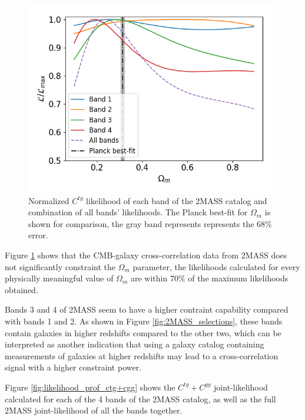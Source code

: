 \documentclass[openany,a4paper,12pt,oneside]{book}
\begin{document}
\begin{spacing}{1.5}
\begin{figure}[!htb]
	\centering
	\includegraphics[width=.7\linewidth]{Imagens/profile_ctg_Nmc2e7.png}
	\caption{Normalized $C^{tg}$ likelihood of each band of the 2MASS catalog and combination of all bands' likelihoods. The Planck best-fit for $\Omega_m$ is shown for comparison, the gray band represents represents the 68\% error.}
	\label{fig:likelihood_prof_ctg}
\end{figure}

Figure \ref{fig:likelihood_prof_ctg} shows that the CMB-galaxy cross-correlation data from 2MASS does not significantly constraint the $\Omega_m$ parameter, the likelihoods calculated for every physically meaningful value of $\Omega_m$ are within 70\% of the maximum likelihoods obtained. 

Bands 3 and 4 of 2MASS seem to have a higher contraint capability compared with bands 1 and 2. As shown in Figure \ref{fig:2MASS_selections}, these bands contain galaxies in higher redshifts compared to the other two, which can be interpreted as another indication that using a galaxy catalog containing measurements of galaxies at higher redshifts may lead to a cross-correlation signal with a higher constraint power.

Figure \ref{fig:likelihood_prof_ctg+cgg} shows the $C^{tg}+C^{gg}$ joint-likelihood calculated for each of the 4 bands of the 2MASS catalog, as well as the full 2MASS joint-likelihood of all the bands together. 


\end{spacing}
\end{document}
